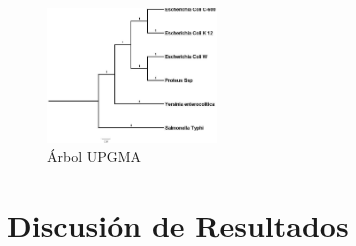 \documentclass[%
 reprint,
 amsmath,amssymb,
 aps,
showkeys
]{revtex4-1}
\begin{document}
	\begin{figure}[h]
	\includegraphics[width=0.4\textwidth]{arbolUPGMA.jpg}
	\caption{Árbol UPGMA}
	\label{Grafica: UPGMA}
	\end{figure}	

\section{\label{sec:Dis}Discusión de Resultados}




\end{document}
